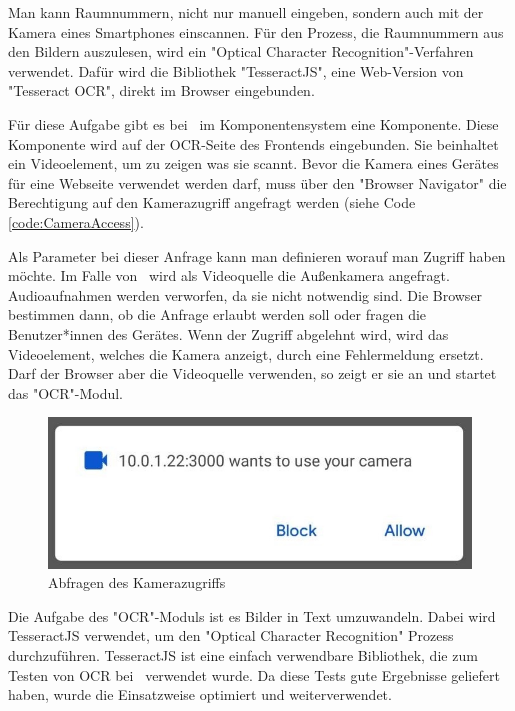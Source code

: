 
\label{sec:ocrmodul}

Man kann Raumnummern, nicht nur manuell eingeben, sondern auch mit der Kamera eines Smartphones einscannen. Für den Prozess, die Raumnummern aus den Bildern auszulesen, wird ein "Optical Character Recognition"-Verfahren verwendet. Dafür wird die Bibliothek "TesseractJS", eine Web-Version von "Tesseract OCR", direkt im Browser eingebunden. \cite{TesseractJS}\cite{TesseractJSImplementation}

Für diese Aufgabe gibt es bei \ZELIA\ im Komponentensystem eine Komponente. Diese Komponente wird auf der OCR-Seite des Frontends eingebunden. Sie beinhaltet ein Videoelement, um zu zeigen was sie scannt. Bevor die Kamera eines Gerätes für eine Webseite verwendet werden darf, muss über den "Browser Navigator" die Berechtigung auf den Kamerazugriff angefragt werden (siehe Code \ref{code:CameraAccess}).


Als Parameter bei dieser Anfrage kann man definieren worauf man Zugriff haben möchte. Im Falle von \ZELIA\ wird als Videoquelle die Außenkamera angefragt. Audioaufnahmen werden verworfen, da sie nicht notwendig sind. Die Browser bestimmen dann, ob die Anfrage erlaubt werden soll oder fragen die Benutzer*innen des Gerätes. Wenn der Zugriff abgelehnt wird, wird das Videoelement, welches die Kamera anzeigt, durch eine Fehlermeldung ersetzt. Darf der Browser aber die Videoquelle verwenden, so zeigt er sie an und startet das "OCR"-Modul.

\begin{figure}[H]
    \centering
    \includegraphics[width=120mm]{media/OCR/cam_access_light.jpg}
    \caption{Abfragen des Kamerazugriffs}
\end{figure}


Die Aufgabe des "OCR"-Moduls ist es Bilder in Text umzuwandeln. Dabei wird TesseractJS verwendet, um den "Optical Character Recognition" Prozess durchzuführen. TesseractJS ist eine einfach verwendbare Bibliothek, die zum Testen von OCR bei \ZELIA\ verwendet wurde. Da diese Tests gute Ergebnisse geliefert haben, wurde die Einsatzweise optimiert und weiterverwendet.

